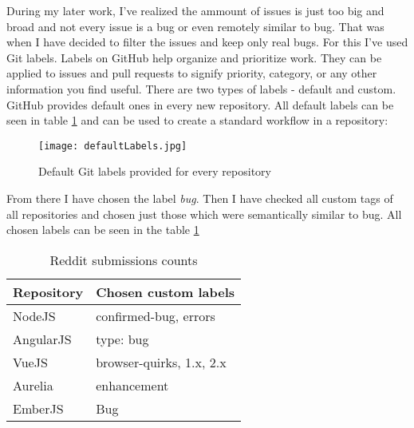 During my later work, I've realized the ammount of issues is just too big and broad and not every issue is a bug or even remotely similar to bug. That was when I have decided to filter the issues and keep only real bugs. For this I've used Git labels. Labels on GitHub help organize and prioritize work. They can be applied to issues and pull requests to signify priority, category, or any other information you find useful. There are two types of labels - default and custom. GitHub provides default ones in every new repository. All default labels can be seen in table \ref{fig:defaultLabels} and can be used to create a standard workflow in a repository:

\begin{figure}[H]%
    \centering
	\texttt{[image: defaultLabels.jpg]}
    \caption{Default Git labels provided for every repository}%
    \label{fig:defaultLabels}%
\end{figure}

From there I have chosen the label \textit{bug}. Then I have checked all custom tags of all repositories and chosen just those which were semantically similar to bug. All chosen labels can be seen in the table \ref{table:allGitBugLabels}


\begin{table}[H]
\centering
\begin{tabular}{ |p{3cm}||p{6cm}|}
 \hline
\textbf{ Repository }& \textbf{Chosen custom labels}\\
 \hline
 NodeJS   & confirmed-bug, errors \\ \hline
 AngularJS &   type: bug \\ \hline
 VueJS & browser-quirks, 1.x, 2.x\\ \hline
 Aurelia & enhancement\\ \hline
 EmberJS & Bug\\ \hline
\end{tabular}
\caption{Reddit submissions counts}
\label{table:allGitBugLabels}
\end{table}
